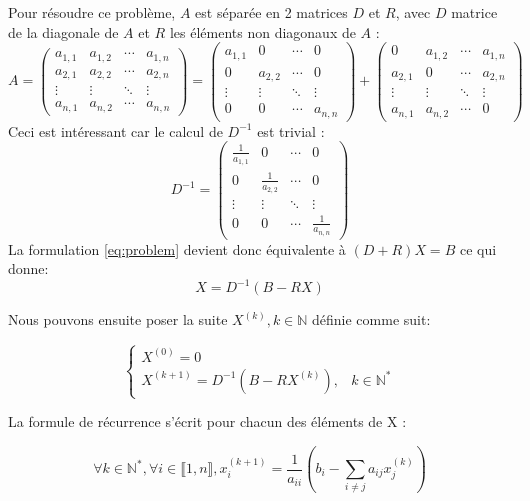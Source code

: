 \documentclass[11pt, a4paper]{article}
\begin{document}
Pour résoudre ce problème, $A$ est séparée en 2 matrices $D$ et $R$, avec $D$ matrice de la diagonale de $A$ et $R$ les éléments non diagonaux de $A$ :
\[
A =
 \begin{pmatrix}
  a_{1,1} & a_{1,2} & \cdots & a_{1,n} \\
  a_{2,1} & a_{2,2} & \cdots & a_{2,n} \\
  \vdots  & \vdots  & \ddots & \vdots  \\
  a_{n,1} & a_{n,2} & \cdots & a_{n,n}
 \end{pmatrix}
 =
  \begin{pmatrix}
  a_{1,1} & 0 & \cdots & 0 \\
  0 & a_{2,2} & \cdots & 0 \\
  \vdots  & \vdots  & \ddots & \vdots  \\
  0 & 0 & \cdots & a_{n,n}
 \end{pmatrix}
 +
  \begin{pmatrix}
  0 & a_{1,2} & \cdots & a_{1,n} \\
  a_{2,1} & 0 & \cdots & a_{2,n} \\
  \vdots  & \vdots  & \ddots & \vdots  \\
  a_{n,1} & a_{n,2} & \cdots & 0
 \end{pmatrix}
\]
Ceci est intéressant car le calcul de $D^{-1}$ est trivial :
\[
D^{-1} =
  \begin{pmatrix}
  \frac{1}{a_{1,1}} & 0 & \cdots & 0 \\
  0 & \frac{1}{a_{2,2}} & \cdots & 0 \\
  \vdots  & \vdots  & \ddots & \vdots  \\
  0 & 0 & \cdots & \frac{1}{a_{n,n}}
 \end{pmatrix}
\]
La formulation \eqref{eq:problem} devient donc équivalente à \((D+R)X=B\)
ce qui donne:
\begin{equation} \label{eq:reeq}
    X = D^{-1} (B-RX)
\end{equation}

Nous pouvons ensuite poser la suite $X^{(k)}, k \in \mathds{N}$ définie comme suit:

\[
\left\{
    \begin{array}{lr}
        X^{(0)} = 0 \\
        X^{(k+1)} = D^{-1} (B-RX^{(k)}),& k \in \mathds{N}^*
    \end{array}
\right.
\]

La formule de récurrence s'écrit pour chacun des éléments de X :

\begin{equation} \label{eq:rec}
    \forall k \in \mathds{N}^*, \forall i \in \llbracket 1,n \rrbracket,
    x^{(k+1)}_i = \frac{1}{a_{ii}} (b_i - \sum_{i \neq j} a_{ij}x^{(k)}_j)
\end{equation}
\end{document}
